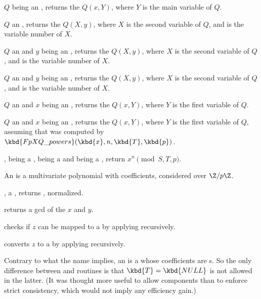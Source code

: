  $Q$ being an , returns the
 $Q(x,Y)$, where $Y$ is the main variable of $Q$.

 $Q$ an , returns
the  $Q(X,y)$, where $X$ is the second variable of $Q$, and 
is the variable number of $X$.

 $Q$ an 
and $y$ being an , returns the  $Q(X,y)$, where $X$ is the
second variable of $Q$, and  is the variable number of $X$.

 $Q$ an 
and $y$ being an , returns the  $Q(X,y)$, where $X$ is the
second variable of $Q$, and  is the variable number of $X$.

 $Q$ an  and
$x$ being an , returns the  $Q(x,Y)$, where $Y$ is the
first variable of $Q$.

 $Q$ an  and
$x$ being an , returns the  $Q(x,Y)$, where $Y$ is the
first variable of $Q$, assuming that  was computed by
$\kbd{FpXQ\_powers}(\kbd{x}, n, \kbd{T}, \kbd{p})$.

,  being a
,  being a  and  being a ,
return $x^n \pmod{S,T,p}$.

An  is a multivariate polynomial with  coefficients,
considered over $\Z/p\Z$.

,  a , returns , normalized.

 returns a gcd of the  $x$ and $y$.

 checks if $z$ can be mapped to a 
by applying  recursively.

 converts $z$ to a 
by applying  recursively.

Contrary to what the name implies, an  is a  whose
coefficients are s. So the only difference between  and
 routines is that $\kbd{T} = \kbd{NULL}$ is not allowed in the
latter. (It was thought more useful to allow  components than to
enforce strict consistency, which would not imply any efficiency gain.)

